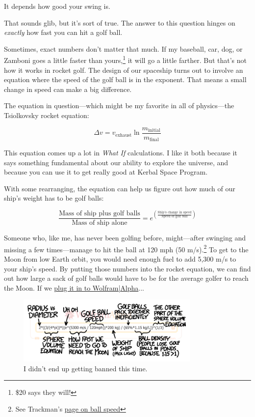 {\hfill{}

{It depends how good your swing is.}

{That sounds glib, but it's sort of true. The answer to this question hinges on \emph{exactly} how fast you can hit a golf ball.}

{Sometimes, exact numbers don't matter that much. If my baseball, car, dog, or Zamboni goes a little faster than yours,{\footnote{\$20 says they will!} } it will go a little farther. But that's not how it works in rocket golf. The design of our spaceship turns out to involve an equation where the speed of the golf ball is in the exponent. That means a small change in speed can make a big difference.}

{The equation in question—which might be my favorite in all of physics—the Tsiolkovsky rocket equation:}

{\[\Delta v = v_\text{exhaust}\ln\frac{m_\text{initial}}{m_\text{final}}\]}

{This equation comes up a lot in \emph{What If} calculations. I like it both because it says something fundamental about our ability to explore the universe, and because you can use it to get really good at Kerbal Space Program.}

{With some rearranging, the equation can help us figure out how much of our ship's weight has to be golf balls:}

{\[\frac{\text{Mass of ship plus golf balls}}{\text{Mass of ship alone}} = e ^{\left (\frac{\text{Ship's change in speed}}{\text{Speed of golf ball}}\right) }\]}

{Someone who, like me, has never been golfing before, might—after swinging and missing a few times—manage to hit the ball at 120 mph (50 m/s).{\footnote{See Trackman's \href{http://mytrackman.com/explore/trackman-data/trackman-ball-data/ball-speed}{page on ball speed}} } To get to the Moon from low Earth orbit, you would need enough fuel to add 5,300 m/s to your ship's speed. By putting those numbers into the rocket equation, we can find out how large a sack of golf balls would have to be for the average golfer to reach the Moon. If we \href{http://www.wolframalpha.com/input/?i=please+calculate+2*\%28\%283\%2F\%284*pi\%29\%29*\%28\%28e\%5E\%285300+m\%2Fs+\%2F+120mph\%29\%29*200+kg\%29+\%2F+\%2865\%25*1.15+kg\%2FL\%29\%29\%5E\%281\%2F3\%29+thank+you} {plug it in to Wolfram|Alpha}...}

\begin{figure}[!htbp]
\centering
\includegraphics[scale=0.5, max width=0.8\textwidth]{imgs/a/85/golf_annotated.png}
\caption{I didn't end up getting banned this time.}
\end{figure}

}
